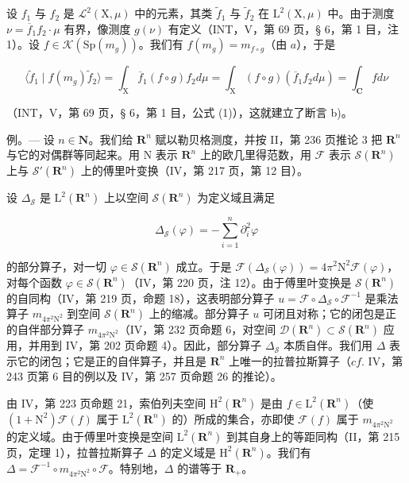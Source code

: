 设 \(f_1\) 与 \(f_2\) 是 \(\mathcal{L}^2(\mathrm{X},\mu)\) 中的元素，其类 \(\widetilde{f}_1\) 与 \(\widetilde{f}_2\) 在 \(\mathrm{L}^2(\mathrm{X},\mu)\) 中。由于测度 \(\nu = \overline{f}_1f_2\cdot \mu\) 有界，像测度 \(g(\nu)\) 有定义（INT，V，第 69 页，§ 6，第 1 目，注 1）。设 \(f\in \mathcal{K}(\mathrm{Sp}(m_g))\)。我们有 \(f(m_{g}) = m_{f\circ g}\)（由 \(a\)），于是

\[
\langle \widetilde {f} _ {1} \mid f (m _ {g}) \widetilde {f} _ {2} \rangle = \int_ {\mathrm{X}} \overline {{f}} _ {1} (f \circ g) f _ {2} d \mu = \int_ {\mathrm{X}} (f \circ g) (\overline {{f}} _ {1} f _ {2} d \mu) = \int_ {\mathbf {C}} f d \nu
\]

（INT，V，第 69 页，§ 6，第 1 目，公式 (1)），这就建立了断言 b)。

例。--- 设 \(n \in \mathbf{N}\)。我们给 \(\mathbf{R}^{n}\) 赋以勒贝格测度，并按 II，第 236 页推论 3 把 \(\mathbf{R}^{n}\) 与它的对偶群等同起来。用 N 表示 \(\mathbf{R}^{n}\) 上的欧几里得范数，用 \(\mathcal{F}\) 表示 \(\mathcal{S}(\mathbf{R}^{n})\) 上与 \(\mathcal{S}'(\mathbf{R}^{n})\) 上的傅里叶变换（IV，第 217 页，第 12 目）。

设 \(\Delta_{\mathcal{S}}\) 是 \(\mathrm{L}^2 (\mathbf{R}^n)\) 上以空间 \(\mathcal{S}(\mathbf{R}^n)\) 为定义域且满足

\[
\Delta_ {\mathcal {S}} (\varphi) = - \sum_ {i = 1} ^ {n} \partial_ {i} ^ {2} \varphi
\]

的部分算子，对一切 \(\varphi\in\mathcal{S}(\mathbf{R}^{n})\) 成立。于是 \(\mathcal{F}(\Delta_{\mathcal{S}}(\varphi))=4\pi^{2}\mathrm{N}^{2}\mathcal{F}(\varphi)\)，对每个函数 \(\varphi\in\mathcal{S}(\mathbf{R}^{n})\)（IV，第 220 页，注 12）。由于傅里叶变换是 \(\mathcal{S}(\mathbf{R}^{n})\) 的自同构（IV，第 219 页，命题 18），这表明部分算子 \(u=\mathcal{F}\circ\Delta_{\mathcal{S}}\circ\mathcal{F}^{-1}\) 是乘法算子 \(m_{4\pi^{2}\mathrm{N}^{2}}\) 到空间 \(\mathcal{S}(\mathbf{R}^{n})\) 上的缩减。部分算子 \(u\) 可闭且对称；它的闭包是正的自伴部分算子 \(m_{4\pi^{2}\mathrm{N}^{2}}\)（IV，第 232 页命题 6，对空间 \(\mathcal{D}(\mathbf{R}^{n})\subset\mathcal{S}(\mathbf{R}^{n})\) 应用，并用到 IV，第 202 页命题 4）。因此，部分算子 \(\Delta_{\mathcal{S}}\) 本质自伴。我们用 \(\Delta\) 表示它的闭包；它是正的自伴算子，并且是 \(\mathbf{R}^{n}\) 上唯一的拉普拉斯算子（\(cf.\) IV，第 243 页第 6 目的例以及 IV，第 257 页命题 26 的推论）。

由 IV，第 223 页命题 21，索伯列夫空间 \(\mathrm{H}^2 (\mathbf{R}^n)\) 是由 \(f\in \mathrm{L}^2 (\mathbf{R}^n)\)（使 \((1 + \mathrm{N}^2)\mathcal{F}(f)\) 属于 \(\mathrm{L}^2 (\mathbf{R}^n)\) 的）所成的集合，亦即使 \(\mathcal{F}(f)\) 属于 \(m_{4\pi^2\mathrm{N}^2}\) 的定义域。由于傅里叶变换是空间 \(\mathrm{L}^2 (\mathbf{R}^n)\) 到其自身上的等距同构（II，第 215 页，定理 1），拉普拉斯算子 \(\Delta\) 的定义域是 \(\mathrm{H}^2 (\mathbf{R}^n)\)。我们有 \(\Delta = \mathcal{F}^{-1}\circ m_{4\pi^2\mathrm{N}^2}\circ \mathcal{F}\)。特别地，\(\Delta\) 的谱等于 \(\mathbf{R}_{+}\)。
\relax{}
